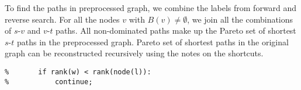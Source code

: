 \vskip 5mm


To find the paths in preprocessed graph, we combine the labels from forward and reverse search. 
For all the nodes $v$ with $B(v) \ne \emptyset$, we join all the combinations of $s$-$v$ and $v$-$t$ paths. 
All non-dominated paths make up the Pareto set of shortest $s$-$t$ paths in the preprocessed graph.
Pareto set of shortest paths in the original graph can be reconstructed recursively using the notes on the shortcuts.

\begin{lstlisting}[caption={Pseudocode MCHq},label="MCHq",captionpos=t,float,abovecaptionskip=-\medskipamount]
%    for every outgoing edge e=(w, node(l)):
%    	if rank(w) < rank(node(l)):
%        	continue;
\end{lstlisting}
